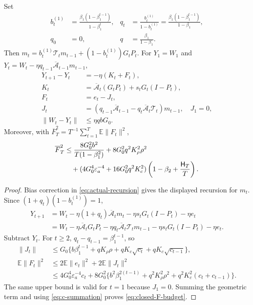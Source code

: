\begin{lemma}
\label{lem:virtual-iterate}
Set
\begin{align}
 b_t^{(1)}&=\frac{\beta_1(1-\beta_1^{t-1})}{1-\beta_1^t},&
 q_t&=\frac{b_t^{(1)}}{1-b_t^{(1)}}
     =\frac{\beta_1(1-\beta_1^{t-1})}{1-\beta_1},\\
 q_0&=0,&q&=\frac{\beta_1}{1-\beta_1}.
\end{align}
Then $m_t=b_t^{(1)}\mathcal T_tm_{t-1}+(1-b_t^{(1)})G_tP_t$.
For $Y_1=W_1$ and
$Y_t=W_t-\eta q_{t-1}\overline{\mathcal A}_{t-1}m_{t-1}$,
\begin{align}
 Y_{t+1}-Y_t&=-\eta(K_t+F_t),\\
 K_t&=\overline{\mathcal A}_t(G_tP_t)+s_tG_t(I-P_t),\\
 F_t&=e_t-J_t,\\
 J_t&=(q_{t-1}\overline{\mathcal A}_{t-1}
                -q_t\overline{\mathcal A}_t\mathcal T_t)m_{t-1},\quad J_1=0,
 \label{eq:virtual-identity}\\
 \|W_t-Y_t\|&\le\eta qbG_0.
\end{align}
Moreover, with $\overline F_T^2=T^{-1}\sum_{t=1}^T\mathbb E\|F_t\|^2$,
\begin{align}
 \overline F_T^2
 &\le\frac{8G_0^2b^2}{T(1-\beta_1^2)}+8G_0^2q^2K_\rho^2\rho^2\notag\\
 &\quad+(4G_0^4\varepsilon_a^{-4}+16G_0^2q^2K_c^2)
                  \left(1-\beta_2+\frac{\mathsf H_T}{T}\right).
 \label{eq:closed-F-budget}
\end{align}
\end{lemma}
\begin{proof}
Bias correction in \eqref{eq:actual-recursion} gives the displayed
recursion for $m_t$. Since $(1+q_t)(1-b_t^{(1)})=1$,
\begin{align}
 Y_{t+1}
 &=W_t-\eta(1+q_t)\overline{\mathcal A}_tm_t
          -\eta s_tG_t(I-P_t)-\eta e_t\\
 &=W_t-\eta\overline{\mathcal A}_tG_tP_t
       -\eta q_t\overline{\mathcal A}_t\mathcal T_tm_{t-1}
       -\eta s_tG_t(I-P_t)-\eta e_t.
\end{align}
Subtract $Y_t$. For $t\ge2$, $q_t-q_{t-1}=\beta_1^{t-1}$, so
\begin{align}
 \|J_t\|
 &\le G_0\{b\beta_1^{t-1}+qK_\rho\rho
                    +qK_c\sqrt{c_t}+qK_c\sqrt{c_{t-1}}\},\\
 \mathbb E\|F_t\|^2
 &\le2\mathbb E\|e_t\|^2+2\mathbb E\|J_t\|^2\\
 &\le4G_0^4\varepsilon_a^{-4}c_t
   +8G_0^2\{b^2\beta_1^{2(t-1)}+q^2K_\rho^2\rho^2
                         +q^2K_c^2(c_t+c_{t-1})\}.
\end{align}
The same upper bound is valid for $t=1$ because $J_1=0$.
Summing the geometric term and using \eqref{eq:c-summation} proves
\eqref{eq:closed-F-budget}.
\end{proof}

